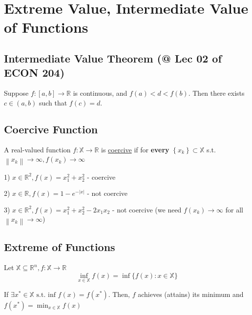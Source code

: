 \documentclass[11pt]{elegantbook}
\begin{document}
\section{Extreme Value, Intermediate Value of Functions}
\subsection{Intermediate Value Theorem \small{(@ Lec 02 of ECON 204)}}
\begin{theorem}
    Suppose $f : [a, b] \rightarrow \mathbb{R}$ is continuous, and $f(a) < d < f(b)$. Then there exists $c \in (a, b)$ such that $f(c) = d$.
\end{theorem}

\subsection{Coercive Function}

\begin{definition}[Coercive]
    A real-valued function $f:\mathbb{X} \rightarrow \mathbb{R}$ is \underline{coercive} if for \textbf{every} $\left\{x_{k}\right\} \subset \mathbb{X}$ s.t. $\left\|x_{k}\right\| \rightarrow \infty, f\left(x_{k}\right) \rightarrow \infty$
\end{definition}

\begin{example}
\end{example}
1) $x \in \mathbb{R}^{2}, f(x)=x_{1}^{2}+x_{2}^{2}$ - coercive

2) $x \in \mathbb{R}, f(x)=1-e^{-|x|}$ - not coercive

3) $x \in \mathbb{R}^{2}, f(x)=x_{1}^{2}+x_{2}^{2}-2 x_{1} x_{2}$ - not coercive
(we need $f(x_k)\rightarrow	\infty$ for all $\left\|x_{k}\right\| \rightarrow \infty$)


\subsection{Extreme of Functions}
\begin{definition}
    Let $\mathbb{X} \subseteq \mathbb{R}^{n}, f: \mathbb{X} \rightarrow \mathbb{R}$
    $$\inf_{x \in \mathbb{X}} f(x)=\inf\{f(x): x \in \mathbb{X}\}$$
\end{definition}

If $\exists x^{*} \in \mathbb{X} \text { s.t. inf } f(x)=f\left(x^{*}\right)$. Then, $f$ achieves (attains) its minimum and $f\left(x^{*}\right)=\min _{x \in \mathbb{X}} f(x)$
\end{document}
